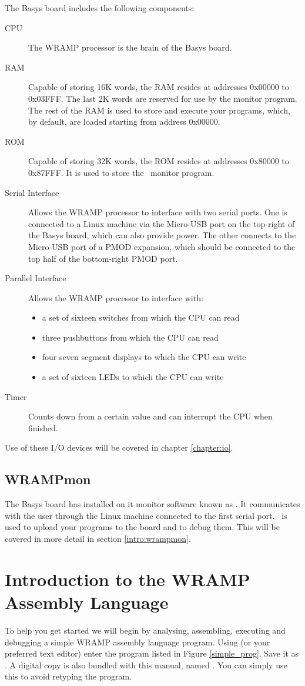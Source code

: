 The Basys board includes the following components:

\begin{description}
\item[CPU] The WRAMP processor is the brain of the Basys board.
%
\item[RAM] Capable of storing 16K words, the RAM resides at addresses 0x00000
to 0x03FFF. The last 2K words are reserved for use by the monitor program. The rest 
of the RAM is used to store and execute your programs, which, by default, are 
loaded starting from address 0x00000.
%
\item[ROM] Capable of storing 32K words, the ROM resides at addresses 
0x80000 to 0x87FFF. It is used to store the \WRAMPmon\ monitor program.
%
\item[Serial Interface] Allows the WRAMP processor to interface with two serial
ports. One is connected to a Linux machine via the Micro-USB port on the top-right
of the Basys board, which can also provide power. The other connects to the Micro-USB
port of a PMOD expansion, which should be connected to the top half of the 
bottom-right PMOD port.
%
\item[Parallel Interface] Allows the WRAMP processor to interface with: 
\begin{itemize}
\item a set of sixteen switches from which the CPU can read
\item three pushbuttons from which the CPU can read
\item four seven segment displays to which the CPU can write
\item a set of sixteen LEDs to which the CPU can write
\end{itemize}
\item[Timer] Counts down from a certain value and can interrupt the CPU when 
finished.
%
\end{description}
Use of these I/O devices will be covered in chapter \ref{chapter:io}.

\subsection{WRAMPmon}
The Basys board has installed on it monitor software known as \WRAMPmon.
It communicates with the user through the Linux machine connected to
the first serial port. \WRAMPmon\ is used to upload your programs to the
board and to debug them. This will be covered in more detail in
section \ref{intro:wrampmon}.
%
%
%
\section{Introduction to the WRAMP Assembly Language}
%
To help you get started we will begin by analysing, assembling,
executing and debugging a simple WRAMP assembly language program.
Using  (or your preferred text editor) enter the
program listed in Figure \ref{simple_prog}. Save it as .
A digital copy is also bundled with this manual, named .
You can simply use this to avoid retyping the program.

